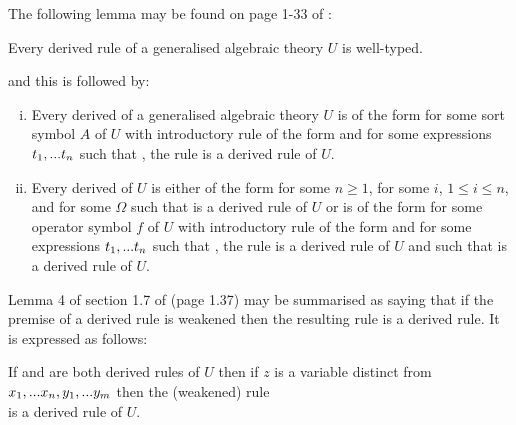 The following lemma may be found on page 1-33 of \cite{Cartmell78}:
\begin{lemma}
Every derived rule of a generalised algebraic theory $U$ is well-typed.
\end{lemma} 
\noindent and this is followed by:
\begin{lemma}
\begin{enumerate}[(i)]
\item Every derived \Trule of a generalised algebraic theory $U$ is of the form
 for some sort symbol $A$ of $U$ with introductory rule of the form
 and for some expressions $t_1,...t_n$ such that \foreachi, the rule
 is a derived rule of $U$.
\item Every derived \trule of $U$ is 
either of the form  for some $n \ge 1$, for some $i$, $1 \leq i \leq n$, 
and for some $\Omega$ such that  is a derived rule of $U$
or is of the form
 for some operator symbol $f$ of $U$ 
with introductory rule of the form
and for some expressions $t_1,...t_n$ such that \foreachi, the rule
 is a derived rule of $U$
and such that
 is a derived rule of $U$.
\end{enumerate}
\end{lemma}

Lemma 4 of section 1.7 of \cite{Cartmell78} (page 1.37) may be summarised as saying that if the premise of a derived rule is weakened then the resulting rule is a derived rule. It is expressed as follows:
\begin{lemma}
If
  and
 are both derived rules of $U$ then if $z$ is a variable
distinct from $x_1,...x_n,y_1,...y_{m}$ then
the (weakened) rule \\
 is a derived rule
of $U$.
\end{lemma}

